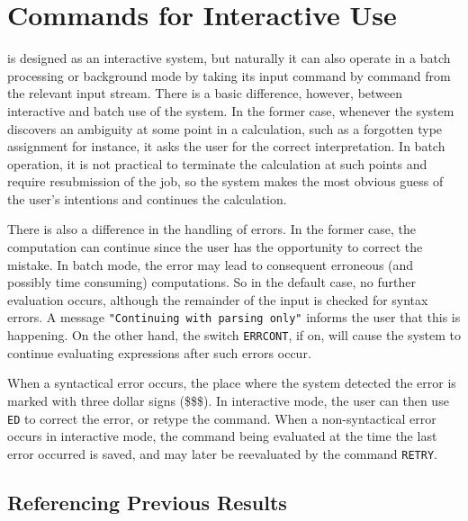 \chapter{Commands for Interactive Use}

{\REDUCE} is designed as an interactive system, but naturally it can also
operate in a batch processing or background mode by taking its input
command by command from the relevant input stream. There is a basic
difference, however, between interactive and batch use of the system. In
the former case, whenever the system discovers an ambiguity at some point
in a calculation, such as a forgotten type assignment for instance, it asks
the user for the correct interpretation. In batch operation, it is not
practical to terminate the calculation at such points and require
resubmission of the job, so the system makes the most obvious guess of the
user's intentions and continues the calculation.

There is also a difference in the handling of errors.  In the former case,
the computation can continue since the user has the opportunity to correct
the mistake.  In batch mode, the error may lead to consequent erroneous
(and possibly time consuming) computations.  So in the default case, no
further evaluation occurs, although the remainder of the input is checked
for syntax errors.  A message {\tt "Continuing with parsing only"}
informs the user that this is happening.  On the other hand, the switch
{\tt ERRCONT}, if on, will cause the system to continue
evaluating expressions after such errors occur.

When a syntactical error occurs, the place where the system detected the
error is marked with three dollar signs (\$\$\$). In interactive mode, the
user can then use {\tt ED} to correct the error, or retype the
command.  When a non-syntactical error occurs in interactive mode, the
command being evaluated at the time the last error occurred is saved, and
may later be reevaluated by the command {\tt RETRY}.

\section{Referencing Previous Results}

